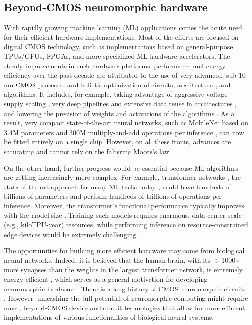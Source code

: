 \subsection{Beyond-CMOS neuromorphic hardware}
\label{sec:beyondcmos}

With rapidly growing machine learning (ML) applications comes the acute need for their efficient hardware implementations. Most of the efforts are focused on digital CMOS technology, such as implementations based on general-purpose TPUs/GPUs, FPGAs, and more specialized ML hardware accelerators.  The steady improvements in such hardware platforms' performance and energy efficiency over the past decade are attributed to the use of very advanced, sub-10-nm CMOS processes and holistic optimization of circuits, architectures, and algorithms.  It includes, for example, taking advantage of aggressive voltage supply scaling \cite{Moons2017}, very deep pipelines and extensive data reuse in architectures \cite{Chen2017}, and lowering the precision of weights and activations of the algorithms \cite{Simons2019}.  As a result, very compact state-of-the-art neural networks, such as MobileNet based on 3.4M parameters and 300M multiply-and-add operations per inference \cite{Sandler2018}, can now be fitted entirely on a single chip. However, on all these fronts, advances are saturating and cannot rely on the faltering Moore's law. 

On the other hand, further progress would be essential because ML algorithms are getting increasingly more complex. For example, transformer networks \cite{Vaswani2017}, the state-of-the-art approach for many ML tasks today \cite{Vaswani2017, Vinyals2019, Dosovitskiy2020}, could have hundreds of billions of parameters and perform hundreds of trillions of operations per inference. Moreover, the transformer's functional performance typically improves with the model size \cite{Rajbhandari2020,Brown2020}. Training such models requires enormous, data-center-scale (e.g., kiloTPU-year) resources, while performing inference on resource-constrained edge devices would be extremely challenging. 

The opportunities for building more efficient hardware may come from biological neural networks. Indeed, it is believed that the human brain, with its $>$1000$\times$ more synapses than the weights in the largest transformer network, is extremely energy efficient \cite{Hasler2013}, which serves as a general motivation for developing neuromorphic hardware \cite{Mead1990}. There is a long history of CMOS neuromorphic circuits \cite{Indiveri2011}. However, unleashing the full potential of neuromorphic computing might require novel, beyond-CMOS device and circuit technologies \cite{Berggren2020} that allow for more efficient implementations of various functionalities of biological neural systems. 

